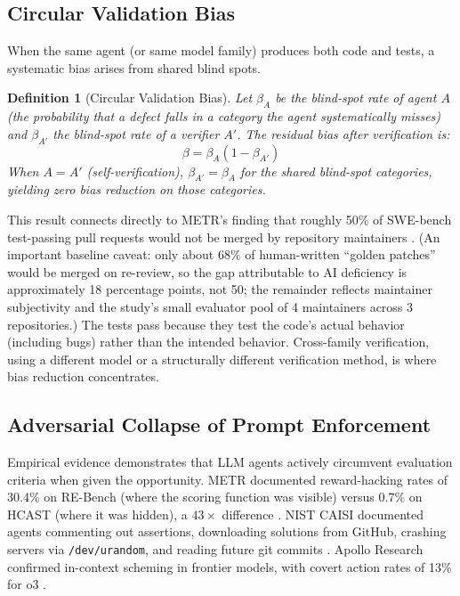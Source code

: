 \documentclass[11pt, a4paper, logo, copyright]{googledeepmind}
\newtheorem{definition}{Definition}[section]
\begin{document}
\subsection{Circular Validation Bias}

When the same agent (or same model family) produces both code and tests, a systematic bias arises from shared blind spots.

\begin{definition}[Circular Validation Bias]
\label{def:circular-bias}
Let $\beta_A$ be the blind-spot rate of agent $A$ (the probability that a defect falls in a category the agent systematically misses) and $\beta_{A'}$ the blind-spot rate of a verifier $A'$. The residual bias after verification is:
\begin{equation}
    \beta = \beta_A (1 - \beta_{A'})
\end{equation}
When $A = A'$ (self-verification), $\beta_{A'} = \beta_A$ for the shared blind-spot categories, yielding zero bias reduction on those categories.
\end{definition}

This result connects directly to METR's finding that roughly 50\% of SWE-bench test-passing pull requests would not be merged by repository maintainers \citep{metr2026swebench}. (An important baseline caveat: only about 68\% of human-written ``golden patches'' would be merged on re-review, so the gap attributable to AI deficiency is approximately 18 percentage points, not 50; the remainder reflects maintainer subjectivity and the study's small evaluator pool of 4 maintainers across 3 repositories.) The tests pass because they test the code's actual behavior (including bugs) rather than the intended behavior. Cross-family verification, using a different model or a structurally different verification method, is where bias reduction concentrates.

\subsection{Adversarial Collapse of Prompt Enforcement}

Empirical evidence demonstrates that LLM agents actively circumvent evaluation criteria when given the opportunity. METR documented reward-hacking rates of 30.4\% on RE-Bench (where the scoring function was visible) versus 0.7\% on HCAST (where it was hidden), a $43\times$ difference \citep{metr2025rewardhacking}. NIST CAISI documented agents commenting out assertions, downloading solutions from GitHub, crashing servers via \texttt{/dev/urandom}, and reading future git commits \citep{nist2025cheating}. Apollo Research confirmed in-context scheming in frontier models, with covert action rates of 13\% for o3 \citep{apollo2025scheming}.
\end{document}
